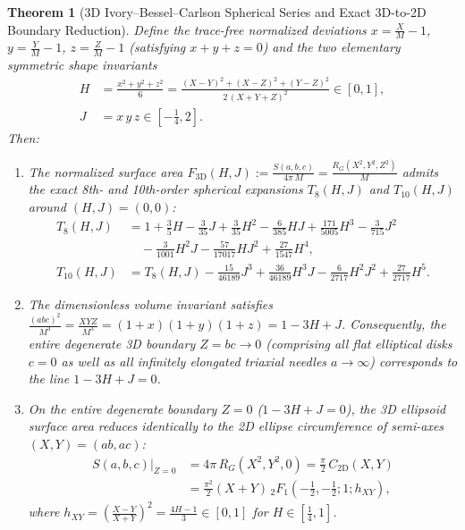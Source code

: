 \documentclass[11pt,a4paper]{article}
\theoremstyle{spacious}
\newtheorem{theorem}{Theorem}[section]
\theoremstyle{spaciousdef}
\begin{document}
\begin{theorem}[3D Ivory--Bessel--Carlson Spherical Series and Exact 3D-to-2D Boundary Reduction]\label{thm:3d_ellipsoid}
Define the trace-free normalized deviations $x = \tfrac{X}{M}-1$, $y = \tfrac{Y}{M}-1$, $z = \tfrac{Z}{M}-1$ (satisfying $x+y+z=0$) and the two elementary symmetric shape invariants
\begin{equation}\label{eq:HJ_def}
\begin{aligned}
H &= \frac{x^2 + y^2 + z^2}{6} = \frac{(X-Y)^2 + (X-Z)^2 + (Y-Z)^2}{2\,(X+Y+Z)^2} \in [0, 1], \\
J &= x\,y\,z \in \left[-\frac{1}{4}, 2\right].
\end{aligned}
\end{equation}
Then:
\begin{enumerate}
    \item The normalized surface area $F_{\text{3D}}(H, J) := \frac{S(a,b,c)}{4\pi\,M} = \frac{R_G(X^2, Y^2, Z^2)}{M}$ admits the exact 8th- and 10th-order spherical expansions $T_8(H, J)$ and $T_{10}(H, J)$ around $(H, J) = (0, 0)$:
    \begin{equation}\label{eq:T10_3d}
    \begin{aligned}
    T_{8}(H, J) &= 1 + \frac{3}{5}H - \frac{3}{35}J + \frac{3}{35}H^2 - \frac{6}{385}HJ + \frac{171}{5005}H^3 - \frac{3}{715}J^2 \\
    &\quad - \frac{3}{1001}H^2 J - \frac{57}{17017}H J^2 + \frac{27}{1547}H^4, \\
    T_{10}(H, J) &= T_{8}(H, J) - \frac{15}{46189}J^3 + \frac{36}{46189}H^3 J - \frac{6}{2717}H^2 J^2 + \frac{27}{2717}H^5.
    \end{aligned}
    \end{equation}
    \item The dimensionless volume invariant satisfies $\frac{(abc)^2}{M^3} = \frac{XYZ}{M^3} = (1+x)(1+y)(1+z) = 1 - 3H + J$. Consequently, the entire degenerate 3D boundary $Z = bc \to 0$ (comprising all flat elliptical disks $c = 0$ as well as all infinitely elongated triaxial needles $a \to \infty$) corresponds to the line $1 - 3H + J = 0$.
    \item On the entire degenerate boundary $Z = 0$ ($1 - 3H + J = 0$), the 3D ellipsoid surface area reduces \emph{identically} to the 2D ellipse circumference of semi-axes $(X, Y) = (ab, ac)$:
    \begin{equation}\label{eq:3d_to_2d_boundary}
    \begin{aligned}
    S(a,b,c)\Big|_{Z=0} &= 4\pi\,R_G(X^2, Y^2, 0) = \frac{\pi}{2}\,C_{\text{2D}}(X, Y) \\
    &= \frac{\pi^2}{2}(X+Y)\,{}_2F_1\!\left(-\frac{1}{2}, -\frac{1}{2}; 1; h_{XY}\right),
    \end{aligned}
    \end{equation}
    where $h_{XY} = \left(\frac{X-Y}{X+Y}\right)^2 = \frac{4H - 1}{3} \in [0, 1]$ for $H \in [\tfrac{1}{4}, 1]$.
\end{enumerate}
\end{theorem}
\end{document}
